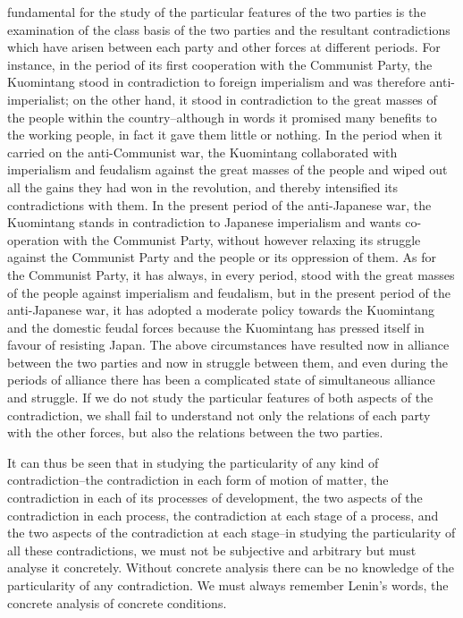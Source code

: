 \documentclass{article}
\begin{document}
fundamental for the study of the particular features of the two parties is the
examination of the class basis of the two parties and the resultant
contradictions which have arisen between each party and other forces at
different periods. For instance, in the period of its first cooperation with
the Communist Party, the Kuomintang stood in contradiction to foreign
imperialism and was therefore anti-imperialist; on the other hand, it stood in
contradiction to the great masses of the people within the country--although in
words it promised many benefits to the working people, in fact it gave them
little or nothing. In the period when it carried on the anti-Communist war, the
Kuomintang collaborated with imperialism and feudalism against the great masses
of the people and wiped out all the gains they had won in the revolution, and
thereby intensified its contradictions with them. In the present period of the
anti-Japanese war, the Kuomintang stands in contradiction to Japanese
imperialism and wants co-operation with the Communist Party, without however
relaxing its struggle against the Communist Party and the people or its
oppression of them. As for the Communist Party, it has always, in every period,
stood with the great masses of the people against imperialism and feudalism,
but in the present period of the anti-Japanese war, it has adopted a moderate
policy towards the Kuomintang and the domestic feudal forces because the
Kuomintang has pressed itself in favour of resisting Japan. The above
circumstances have resulted now in alliance between the two parties and now in
struggle between them, and even during the periods of alliance there has been
a complicated state of simultaneous alliance and struggle. If we do not study
the particular features of both aspects of the contradiction, we shall fail to
understand not only the relations of each party with the other forces, but also
the relations between the two parties.

It can thus be seen that in studying the particularity of any kind of
contradiction--the contradiction in each form of motion of matter, the
contradiction in each of its processes of development, the two aspects of the
contradiction in each process, the contradiction at each stage of a process,
and the two aspects of the contradiction at each stage--in studying the
particularity of all these contradictions, we must not be subjective and
arbitrary but must analyse it concretely. Without concrete analysis there can
be no knowledge of the particularity of any contradiction. We must always
remember Lenin's words, the concrete analysis of concrete conditions.
\end{document}
